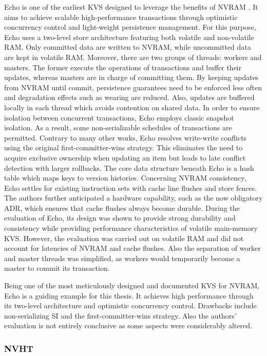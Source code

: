 Echo is one of the earliest KVS designed to leverage the benefits of NVRAM
\cite{bailey2013exploring}. It aims to achieve scalable high-performance
transactions through optimistic concurrency control and light-weight persistence
management. For this purpose, Echo uses a two-level store architecture featuring
both volatile and non-volatile RAM. Only committed data are written to NVRAM,
while uncommitted data are kept in volatile RAM. Moreover, there are two groups
of threads: workers and masters. The former execute the operations of
transactions and buffer their updates, whereas masters are in charge of
committing them. By keeping updates from NVRAM until commit, persistence
guarantees need to be enforced less often and degradation effects such as
wearing are reduced. Also, updates are buffered locally in each thread which
avoids contention on shared data. In order to ensure isolation between
concurrent transactions, Echo employs classic snapshot isolation. As a result,
some non-serializable schedules of transactions are permitted. Contrary to many
other works, Echo resolves write-write conflicts using the original
first-committer-wins strategy. This eliminates the need to acquire exclusive
ownership when updating an item but leads to late conflict detection with larger
rollbacks. The core data structure beneath Echo is a hash table which maps keys
to version histories. Concerning NVRAM consistency, Echo settles for existing
instruction sets with cache line flushes and store fences. The authors further
anticipated a hardware capability, such as the now obligatory ADR, which ensures
that cache flushes always become durable. During the evaluation of Echo, its
design was shown to provide strong durability and consistency while providing
performance characteristics of volatile main-memory KVS. However, the evaluation
was carried out on volatile RAM and did not account for latencies of NVRAM and
cache flushes. Also the separation of worker and master threads was simplified,
as workers would temporarily become a master to commit its transaction.

Being one of the most meticulously designed and documented KVS for NVRAM, Echo
is a guiding example for this thesis. It achieves high performance through its
two-level architecture and optimistic concurrency control. Drawbacks include
non-serializing SI and the first-committer-wins strategy. Also the authors'
evaluation is not entirely conclusive as some aspects were considerably altered.

\subsubsection{NVHT}

